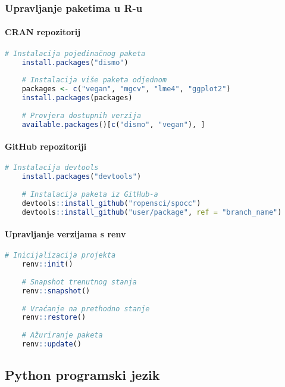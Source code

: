 \documentclass[11pt,oneside]{book}
\begin{document}
\subsubsection{Upravljanje paketima u R-u}

\paragraph{CRAN repozitorij}

\begin{lstlisting}[language=R, caption=Instalacija paketa iz CRAN-a]
	# Instalacija pojedinačnog paketa
	install.packages("dismo")
	
	# Instalacija više paketa odjednom
	packages <- c("vegan", "mgcv", "lme4", "ggplot2")
	install.packages(packages)
	
	# Provjera dostupnih verzija
	available.packages()[c("dismo", "vegan"), ]
\end{lstlisting}

\paragraph{GitHub repozitoriji}

\begin{lstlisting}[language=R, caption=Instalacija iz GitHub-a]
	# Instalacija devtools
	install.packages("devtools")
	
	# Instalacija paketa iz GitHub-a
	devtools::install_github("ropensci/spocc")
	devtools::install_github("user/package", ref = "branch_name")
\end{lstlisting}

\paragraph{Upravljanje verzijama s renv}

\begin{lstlisting}[language=R, caption=Reproducibilno okruženje s renv]
	# Inicijalizacija projekta
	renv::init()
	
	# Snapshot trenutnog stanja
	renv::snapshot()
	
	# Vraćanje na prethodno stanje
	renv::restore()
	
	# Ažuriranje paketa
	renv::update()
\end{lstlisting}

\subsection{Python programski jezik}
\end{document}
